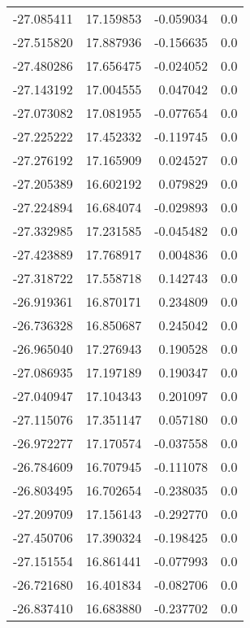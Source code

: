 \begin{tabular}{rrrr}
      -27.085411 &        17.159853 &   -0.059034 &   0.0 \\
      -27.515820 &        17.887936 &   -0.156635 &   0.0 \\
      -27.480286 &        17.656475 &   -0.024052 &   0.0 \\
      -27.143192 &        17.004555 &    0.047042 &   0.0 \\
      -27.073082 &        17.081955 &   -0.077654 &   0.0 \\
      -27.225222 &        17.452332 &   -0.119745 &   0.0 \\
      -27.276192 &        17.165909 &    0.024527 &   0.0 \\
      -27.205389 &        16.602192 &    0.079829 &   0.0 \\
      -27.224894 &        16.684074 &   -0.029893 &   0.0 \\
      -27.332985 &        17.231585 &   -0.045482 &   0.0 \\
      -27.423889 &        17.768917 &    0.004836 &   0.0 \\
      -27.318722 &        17.558718 &    0.142743 &   0.0 \\
      -26.919361 &        16.870171 &    0.234809 &   0.0 \\
      -26.736328 &        16.850687 &    0.245042 &   0.0 \\
      -26.965040 &        17.276943 &    0.190528 &   0.0 \\
      -27.086935 &        17.197189 &    0.190347 &   0.0 \\
      -27.040947 &        17.104343 &    0.201097 &   0.0 \\
      -27.115076 &        17.351147 &    0.057180 &   0.0 \\
      -26.972277 &        17.170574 &   -0.037558 &   0.0 \\
      -26.784609 &        16.707945 &   -0.111078 &   0.0 \\
      -26.803495 &        16.702654 &   -0.238035 &   0.0 \\
      -27.209709 &        17.156143 &   -0.292770 &   0.0 \\
      -27.450706 &        17.390324 &   -0.198425 &   0.0 \\
      -27.151554 &        16.861441 &   -0.077993 &   0.0 \\
      -26.721680 &        16.401834 &   -0.082706 &   0.0 \\
      -26.837410 &        16.683880 &   -0.237702 &   0.0 \\

\end{tabular}
